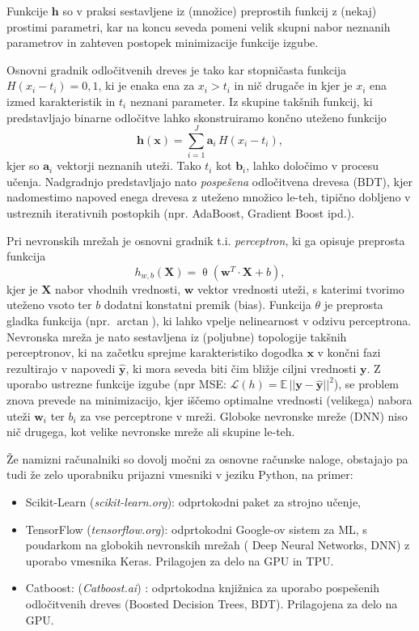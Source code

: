 \documentclass{article}
\begin{document}
 Funkcije $\mathbf{h}$ so v praksi sestavljene iz (množice) preprostih funkcij z (nekaj) prostimi
 parametri, kar na koncu seveda pomeni velik skupni nabor neznanih parametrov in zahteven
 postopek minimizacije funkcije izgube. 
 
 Osnovni gradnik odločitvenih dreves je tako kar stopničasta funkcija $H(x_i-t_i)={0,1}$, ki je enaka
 ena za $x_i > t_i$ in nič drugače in kjer je $x_i$ ena izmed karakteristik in $t_i$ neznani parameter.
Iz skupine takšnih funkcij, ki predstavljajo binarne odločitve lahko skonstruiramo končno uteženo 
funkcijo \[
\mathbf{h}(\mathbf{x})=\sum\limits_{i=1}^{J} \mathbf{a}_{i}\, H(x_i-t_i),\] kjer so $\mathbf{a}_i$ vektorji neznanih uteži. 
Tako $t_i$ kot $\mathbf{b}_i$, lahko določimo v procesu učenja. Nadgradnjo predstavljajo nato \emph{pospešena} odločitvena
drevesa (BDT), kjer nadomestimo napoved enega drevesa z uteženo množico le-teh, tipično dobljeno
v ustreznih iterativnih postopkih (npr. AdaBoost, Gradient Boost ipd.).

Pri nevronskih mrežah je osnovni gradnik t.i. \emph{perceptron}, ki ga opisuje preprosta funkcija
\[h_{w,b}(\mathbf{X})=\operatorname{\theta}\left(\mathbf{w}^{T} \cdot \mathbf{X} + b\right),\]
kjer je $\mathbf{X}$ nabor vhodnih vrednosti, $\mathbf{w}$ vektor vrednosti uteži, s katerimi
tvorimo uteženo vsoto ter $b$ dodatni konstatni premik (bias). Funkcija $\theta$ je preprosta
gladka funkcija (npr. $\arctan$), ki lahko vpelje nelinearnost v odzivu perceptrona. Nevronska
mreža je nato sestavljena iz (poljubne) topologije takšnih perceptronov, ki na začetku
sprejme karakteristiko dogodka $\mathbf{x}$ v končni fazi rezultirajo v napovedi $\mathbf{\hat{y}}$, ki 
mora seveda biti čim bližje ciljni vrednosti $\mathbf{y}$. Z uporabo ustrezne funkcije 
izgube (npr MSE: \(\mathcal{L}(h)=\mathbb{E}\, ||\mathbf{y}-\mathbf{\hat{y}}||^2\)), se problem znova prevede na
minimizacijo, kjer iščemo optimalne vrednosti (velikega) nabora uteži $\mathbf{w}_i$ ter
$b_i$ za vse perceptrone v mreži. Globoke nevronske mreže (DNN) niso nič drugega, kot 
velike nevronske mreže ali skupine le-teh. 

Že namizni računalniki so
dovolj močni za  osnovne računske naloge, obstajajo pa tudi že zelo uporabniku prijazni vmesniki v jeziku Python, na primer:
\begin{itemize}
  \item Scikit-Learn (\emph{scikit-learn.org}): odprtokodni paket za strojno učenje,
  \item TensorFlow (\emph{tensorflow.org}): odprtokodni Google-ov sistem za ML, s poudarkom na globokih nevronskih mrežah 
  ( Deep Neural Networks, DNN) z uporabo vmesnika Keras. Prilagojen za delo na GPU in TPU. 
  \item Catboost: (\emph{Catboost.ai}) : odprtokodna knjižnica za uporabo pospešenih odločitvenih dreves (Boosted Decision Trees, BDT). Prilagojena za delo na GPU.
\end{itemize}
\end{document}

